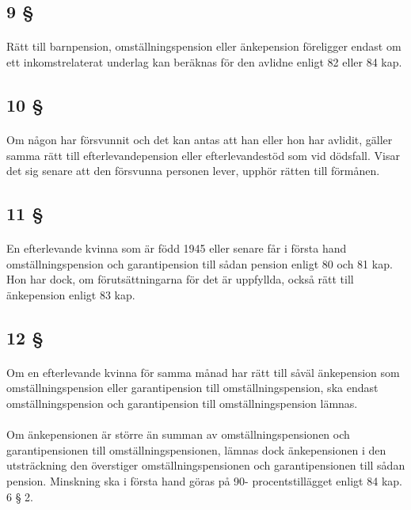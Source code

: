 \documentclass[a4paper,notitlepage,openany,10pt]{book}
\begin{document}
\subsection*{9 §}
\paragraph*{}
Rätt till barnpension, omställningspension eller änkepension föreligger endast om ett inkomstrelaterat underlag kan beräknas för den avlidne enligt 82 eller 84 kap.
\subsection*{10 §}
\paragraph*{}
Om någon har försvunnit och det kan antas att han eller hon har avlidit, gäller samma rätt till efterlevandepension eller efterlevandestöd som vid dödsfall. Visar det sig senare att den försvunna personen lever, upphör rätten till förmånen.
\subsection*{11 §}
\paragraph*{}
En efterlevande kvinna som är född 1945 eller senare får i första hand omställningspension och garantipension till sådan pension enligt 80 och 81 kap. Hon har dock, om förutsättningarna för det är uppfyllda, också rätt till änkepension enligt 83 kap.
\subsection*{12 §}
\paragraph*{}
Om en efterlevande kvinna för samma månad har rätt till såväl änkepension som omställningspension eller garantipension till omställningspension, ska endast omställningspension och garantipension till omställningspension lämnas.
\paragraph*{}
Om änkepensionen är större än summan av omställningspensionen och garantipensionen till omställningspensionen, lämnas dock änkepensionen i den utsträckning den överstiger omställningspensionen och garantipensionen till sådan pension. Minskning ska i första hand göras på 90- procentstillägget enligt 84 kap. 6 § 2.
\end{document}
